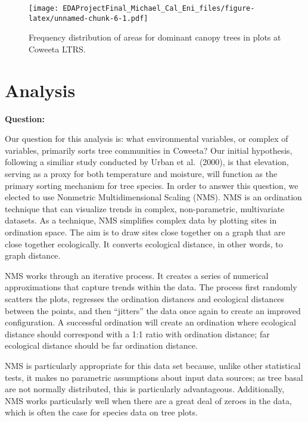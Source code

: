 \documentclass[
  12pt,
]{article}
\begin{document}
\begin{figure}
\centering
\texttt{[image: EDAProjectFinal\_Michael\_Cal\_Eni\_files/figure-latex/unnamed-chunk-6-1.pdf]}
\caption{Frequency distribution of areas for dominant canopy trees in
plots at Coweeta LTRS.}
\end{figure}

\newpage

\hypertarget{analysis}{%
\section{Analysis}\label{analysis}}

\textbf{Question:}

Our question for this analysis is: what environmental variables, or
complex of variables, primarily sorts tree communities in Coweeta? Our
initial hypothesis, following a similiar study conducted by Urban et
al.~(2000), is that elevation, serving as a proxy for both temperature
and moisture, will function as the primary sorting mechanism for tree
species. In order to answer this question, we elected to use Nonmetric
Multidimensional Scaling (NMS). NMS is an ordination technique that can
visualize trends in complex, non-parametric, multivariate datasets. As a
technique, NMS simplifies complex data by plotting sites in ordination
space. The aim is to draw sites close together on a graph that are close
together ecologically. It converts ecological distance, in other words,
to graph distance.

NMS works through an iterative process. It creates a series of numerical
approximations that capture trends within the data. The process first
randomly scatters the plots, regresses the ordination distances and
ecological distances between the points, and then ``jitters'' the data
once again to create an improved configuration. A successful ordination
will create an ordination where ecological distance should correspond
with a 1:1 ratio with ordination distance; far ecological distance
should be far ordination distance.

NMS is particularly appropriate for this data set because, unlike other
statistical tests, it makes no parametric assumptions about input data
sources; as tree basal are not normally distributed, this is
particularly advantageous. Additionally, NMS works particularly well
when there are a great deal of zeroes in the data, which is often the
case for species data on tree plots.
\end{document}
